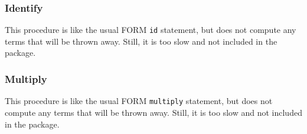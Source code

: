 \documentclass[titlepage]{article}
\begin{document}
\subsubsection{Identify}
\label{sec:impl_id}

This procedure is like the usual FORM {\tt id} statement, but does not
compute any terms that will be thrown away. Still, it is too slow and
not included in the package.


\subsubsection{Multiply}
\label{sec:impl_multi}

This procedure is like the usual FORM {\tt multiply} statement, but does not
compute any terms that will be thrown away. Still, it is too slow and
not included in the package.
\end{document}
